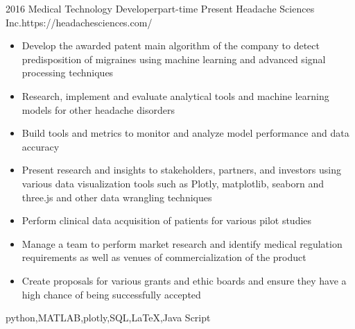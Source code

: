 \begin{experiences}
	\myExperience
	{2016}       {Medical Technology Developer}{part-time}
	{Present}      {Headache Sciences Inc.}{https://headachesciences.com/}
	{
		\begin{itemize}
			\item Develop the awarded patent main algorithm of the company to detect predisposition of migraines using machine learning and advanced signal processing techniques
			\item Research, implement and evaluate analytical tools and machine learning models for other headache disorders
			\item Build tools and metrics to monitor and analyze model performance and data accuracy
			\item Present research and insights to stakeholders, partners, and investors using various data visualization tools such as Plotly, matplotlib, seaborn and three.js and other data wrangling techniques
			\item Perform clinical data acquisition of patients for various pilot studies
			\item Manage a team to perform market research and identify medical regulation requirements as well as venues of commercialization of the product
			\item Create proposals for various grants and ethic boards and ensure they have a high chance of being successfully accepted
		\end{itemize}
	}
	{python,MATLAB,plotly,SQL,\LaTeX,Java Script}
	
\end{experiences}
